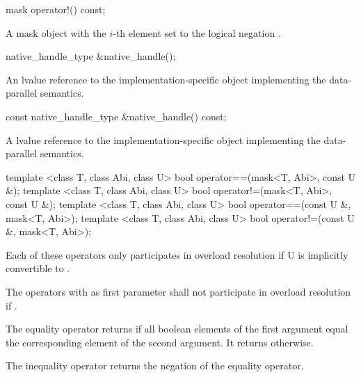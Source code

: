 \begin{itemdecl}
mask operator!() const;
\end{itemdecl}
\begin{itemdescr}
  \pnum\returns A mask object with the $i$-th element set to the logical negation \foralli.
\end{itemdescr}

\begin{itemdecl}
native_handle_type &native_handle();
\end{itemdecl}
\begin{itemdescr}
  \pnum\returns An lvalue reference to the implementation-specific object implementing the data-parallel semantics.
\end{itemdescr}

\begin{itemdecl}
const native_handle_type &native_handle() const;
\end{itemdecl}
\begin{itemdescr}
  \pnum\returns A \const lvalue reference to the implementation-specific object implementing the data-parallel semantics.
\end{itemdescr}


\begin{itemdecl}
template <class T, class Abi, class U> bool operator==(mask<T, Abi>, const U &);
template <class T, class Abi, class U> bool operator!=(mask<T, Abi>, const U &);
template <class T, class Abi, class U> bool operator==(const U &, mask<T, Abi>);
template <class T, class Abi, class U> bool operator!=(const U &, mask<T, Abi>);
\end{itemdecl}
\begin{itemdescr}
  \pnum\remarks Each of these operators only participates in overload resolution if \type U is implicitly convertible to \mask[<T, Abi>].

  \pnum\remarks The operators with  as first parameter shall not participate in overload resolution if .

  \pnum\returns The equality operator returns \true if all boolean elements of the first argument equal the corresponding element of the second argument.
  It returns \false otherwise.

  \pnum\returns The inequality operator returns the negation of the equality operator.
\end{itemdescr}

